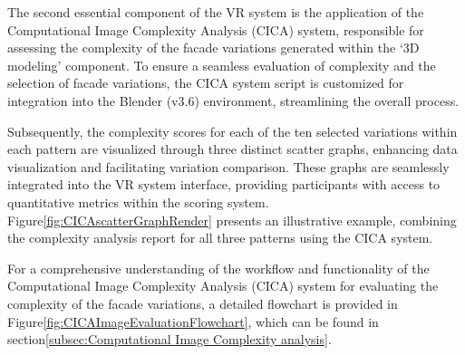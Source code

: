 %    

The second essential component of the VR system is the application of the Computational Image Complexity Analysis (CICA) system, responsible for assessing the complexity of the facade variations generated within the `3D modeling' component.
To ensure a seamless evaluation of complexity and the selection of facade variations, the CICA system script is customized for integration into the Blender (v3.6) environment, streamlining the overall process.

Subsequently, the complexity scores for each of the ten selected variations within each pattern are visualized through three distinct scatter graphs, enhancing data visualization and facilitating variation comparison.
These graphs are seamlessly integrated into the VR system interface, providing participants with access to quantitative metrics within the scoring system.
Figure\ref{fig:CICAscatterGraphRender} presents an illustrative example, combining the complexity analysis report for all three patterns using the CICA system.

For a comprehensive understanding of the workflow and functionality of the Computational Image Complexity Analysis (CICA) system for evaluating the complexity of the facade variations, a detailed flowchart is provided in Figure\ref{fig:CICAImageEvaluationFlowchart}, which can be found in section\ref{subsec:Computational Image Complexity analysis}.

